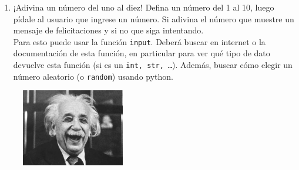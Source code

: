 \documentclass[a4paper]{article}
\begin{document}
\begin{enumerate}
\item ¡Adivina un número del uno al diez! Defina un número del 1 al 10, luego pídale al usuario que ingrese un número. Si adivina el número que muestre un mensaje de felicitaciones y si no que siga intentando.\\
    Para esto puede usar la función \texttt{input}. Deberá buscar en internet o la documentación de esta función, en particular para ver qué tipo de dato devuelve esta función (si es un \texttt{int, str, \ldots}). Además, buscar cómo elegir un número aleatorio (o \texttt{random}) usando python.
\end{enumerate}

\begin{figure}[H]
 \centering
 \includegraphics[width=0.4\textwidth]{einstein.jpeg}
 \label{Einstein}
\end{figure}
\end{document}
